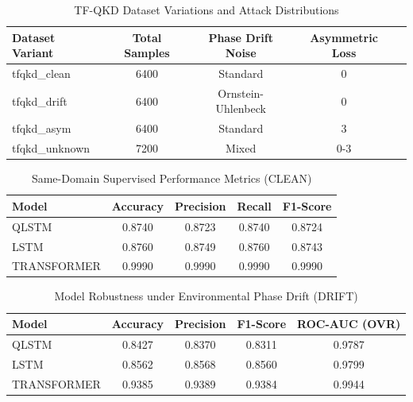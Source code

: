 \begin{table}[htbp]
\centering
\caption{TF-QKD Dataset Variations and Attack Distributions}
\label{tab:dataset_params}
\begin{tabular}{@{}lcccc@{}}
\toprule
\textbf{Dataset Variant} & \textbf{Total Samples} & \textbf{Phase Drift Noise} & \textbf{Asymmetric Loss} \\ \midrule
tfqkd\_clean & 6400 & Standard & 0 \\
tfqkd\_drift & 6400 & Ornstein-Uhlenbeck & 0 \\
tfqkd\_asym & 6400 & Standard & 3 \\
tfqkd\_unknown & 7200 & Mixed & 0-3 \\
\bottomrule
\end{tabular}
\end{table}
\begin{table}[htbp]
\centering
\caption{Same-Domain Supervised Performance Metrics (CLEAN)}
\label{tab:clean_metrics}
\begin{tabular}{@{}lcccc@{}}
\toprule
\textbf{Model} & \textbf{Accuracy} & \textbf{Precision} & \textbf{Recall} & \textbf{F1-Score} \\ \midrule
QLSTM & 0.8740 & 0.8723 & 0.8740 & 0.8724 \\
LSTM & 0.8760 & 0.8749 & 0.8760 & 0.8743 \\
TRANSFORMER & 0.9990 & 0.9990 & 0.9990 & 0.9990 \\
\bottomrule
\end{tabular}
\end{table}
\begin{table}[htbp]
\centering
\caption{Model Robustness under Environmental Phase Drift (DRIFT)}
\label{tab:drift_metrics}
\begin{tabular}{@{}lcccc@{}}
\toprule
\textbf{Model} & \textbf{Accuracy} & \textbf{Precision} & \textbf{F1-Score} & \textbf{ROC-AUC (OVR)} \\ \midrule
QLSTM & 0.8427 & 0.8370 & 0.8311 & 0.9787 \\
LSTM & 0.8562 & 0.8568 & 0.8560 & 0.9799 \\
TRANSFORMER & 0.9385 & 0.9389 & 0.9384 & 0.9944 \\
\bottomrule
\end{tabular}
\end{table}
